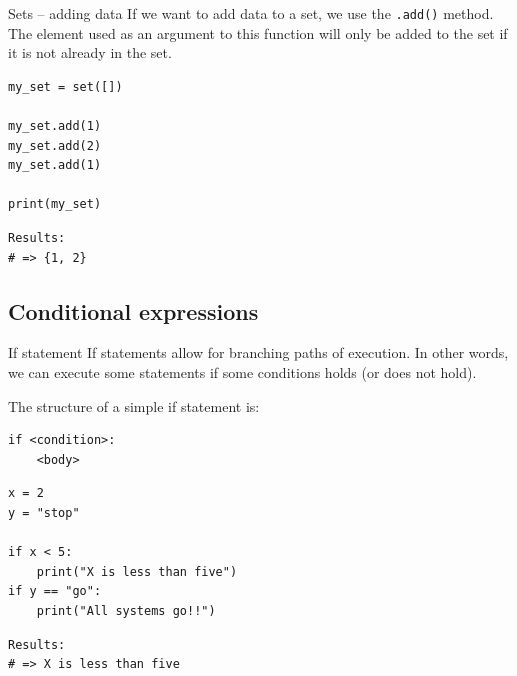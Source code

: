\documentclass[10pt]{beamer}
\begin{document}
\begin{frame}[label={sec:org4ce8bb4},fragile]{Sets -- adding data}
 If we want to add data to a set, we use the \texttt{.add()} method. The element used as an
argument to this function will only be added to the set if it is not already in the
set.

\begin{verbatim}
my_set = set([])

my_set.add(1)
my_set.add(2)
my_set.add(1)

print(my_set)
\end{verbatim}

\begin{verbatim}
Results: 
# => {1, 2}
\end{verbatim}
\end{frame}

\subsection{Conditional expressions}
\label{sec:org271618c}
\begin{frame}[label={sec:org8812c40},fragile]{If statement}
 If statements allow for branching paths of execution. In other words, we can execute
some statements if some conditions holds (or does not hold).

The structure of a simple if statement is:

\begin{verbatim}
if <condition>:
    <body>
\end{verbatim}

\begin{verbatim}
x = 2
y = "stop"

if x < 5:
    print("X is less than five")
if y == "go":
    print("All systems go!!")
\end{verbatim}

\begin{verbatim}
Results: 
# => X is less than five
\end{verbatim}
\end{frame}
\end{document}
